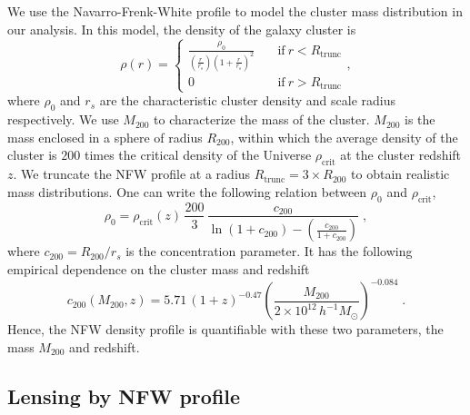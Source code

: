 \documentclass[prd, superscriptaddress, tightenlines, longbibliography, nofootinbib, eqsecnum, amsfonts, amsmath, floatfix, twocolumn, notitlepage]{revtex4-2}
\begin{document}
We use the Navarro-Frenk-White profile \cite[NFW,][]{Navarro:1995iw} to model the cluster mass distribution in our analysis. In this model, the density of the galaxy cluster is
\begin{equation}\label{eq:NFW}
    \rho(r) = \begin{cases} \displaystyle 
               \frac{\rho_0}{(\frac{r}{r_s})(1+\frac{r}{r_s})^2} &\quad \text{if} \ r < R_{\text{trunc}} \\
               0  &\quad \text{if} \ r > R_{\text{trunc}}
               \end{cases},
\end{equation}
where $\rho_0$ and $r_s$ are the characteristic cluster density and scale radius respectively. 
We use $M_{200}$ to characterize the mass of the cluster. $M_{200}$ is the mass enclosed in a sphere of radius $R_{200}$, within which the average density of the cluster is $200$ times the critical density of the Universe $\rho_{\text{crit}}$ at the cluster redshift $z$.
We truncate the NFW profile at a radius $R_{\text{trunc}} = 3\times R_{200}$ to obtain realistic mass distributions.
One can write the following relation between $\rho_0$ and $\rho_{\text{crit}}$,
\begin{equation}\label{eq:rho_0}
    \rho_0 = \rho_{\text{crit}}(z) \,  \frac{200}{3} \,  \frac{c_{200}}{ \displaystyle \ln{(1+c_{200})}-\left(\frac{c_{200}}{1+c_{200}}\right)} \; ,
\end{equation}
where $c_{200} = R_{200}/r_s$ is the concentration parameter. It has the following empirical dependence on the cluster mass and redshift \cite{Duffy:2008pz, Geach:2017crt}
\begin{equation}\label{eq:c200}
    c_{200}(M_{200}, z) = 5.71 \, (1+z)^{-0.47} \left(\frac{M_{200}}{2\times10^{12} \, h^{-1}M_{\odot}}\right)^{-0.084} \; .
\end{equation}
Hence, the NFW density profile is quantifiable with these two parameters, the mass $M_{200}$ and redshift.

\subsection{Lensing by NFW profile}
\end{document}
